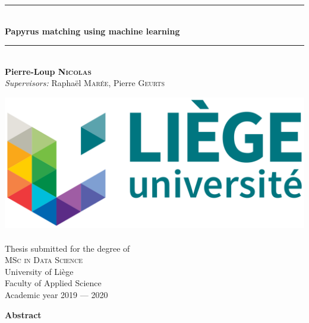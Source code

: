 \documentclass[11pt]{report}
\newcommand{\HRule}{\rule{\linewidth}{0.5mm}}
\begin{document}


\begin{titlepage}
  \begin{center}


    \HRule \\[0.4cm]
    { \Huge \textbf{Papyrus matching using machine learning}\\[0.4cm] }
    \HRule \\[0.8cm]
    
    {\Large \textbf{Pierre-Loup \textsc{Nicolas}}\\[0.2cm]
     \textit{Supervisors:} Raphaël \textsc{Marée}, Pierre \textsc{Geurts}\\[1cm]}
    
    \includegraphics[scale=0.25]{uliege2.png}~\\[1.3cm]
    
    {\huge Thesis submitted for the degree of\\
    \textsc{MSc in Data Science}}
    \\[3cm]

    {\Large University of Liège\\
    Faculty of Applied Science}\\[0.2cm]
    {\large Academic year 2019 — 2020}

  \end{center}
\end{titlepage}


\vspace*{5cm}
{\Huge \textbf{Abstract}}\\[0.4cm]
\end{document}
